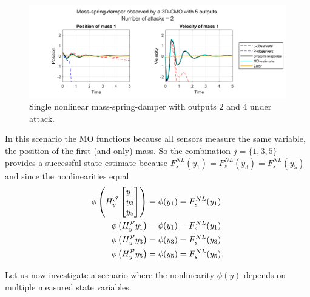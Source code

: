 \begin{example}
    \begin{figure}[H]
        \centering
        \includegraphics[width=\linewidth]{report/Figures/single-nonnlinear-functional.png}
        \caption{Single nonlinear mass-spring-damper with outputs $2$ and $4$ under attack.}
        \label{fig:single-nonlinear-functional}
    \end{figure}
    In this scenario the MO functions because all sensors measure the same variable, the position of the first (and only) mass. So the combination $j=\{1,3,5\}$ provides a successful state estimate because $F^{NL}_s(y_1) = F^{NL}_s(y_3) = F^{NL}_s(y_5)$ and since the nonlinearities equal
    \begin{equation*}
        \begin{split}
            \phi \left( H^{\mathcal{J}}_{y}
            \begin{bmatrix}
                y_1 \\ y_3 \\ y_5
            \end{bmatrix} \right) &= \phi(y_1) = F^{NL}_s(y_1) \\       \phi \left( H^{\mathcal{P}}_{y}y_1 \right) &= \phi(y_1) = F^{NL}_s(y_1) \\
            \phi \left( H^{\mathcal{P}}_{y}y_3 \right) &= \phi(y_3) = F^{NL}_s(y_3) \\
            \phi \left( H^{\mathcal{P}}_{y}y_5 \right) &= \phi(y_5) = F^{NL}_s(y_5). \\
        \end{split}
    \end{equation*} 
\end{example}
Let us now investigate a scenario where the nonlinearity $\phi(y)$ depends on multiple measured state variables.


